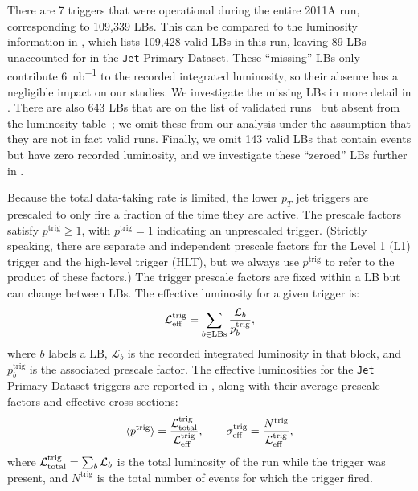 \documentclass[aps,prd,twocolumn,preprintnumbers,nofootinbib,longbibliography,floatfix,superscriptaddress]{revtex4-1}
\begin{document}
There are 7 triggers that were operational during the entire 2011A run, corresponding to 109,339 LBs.
%
This can be compared to the luminosity information in , which lists 109,428 valid LBs in this run, leaving 89 LBs unaccounted for in the \texttt{Jet} Primary Dataset.
%
These ``missing'' LBs only contribute \SI{6}{{nb}^{-1}} to the recorded integrated luminosity, so their absence has a negligible impact on our studies.
%
We investigate the missing LBs in more detail in .
%
There are also 643 LBs that are on the list of validated runs~\cite{CMS:ValidatedRuns2011A} but absent from the luminosity table~\cite{CMS:luminosity2011}; we omit these from our analysis under the assumption that they are not in fact valid runs.
%
Finally, we omit 143 valid LBs that contain events but have zero recorded luminosity, and we investigate these ``zeroed'' LBs further in .


Because the total data-taking rate is limited, the lower $p_T$ jet triggers are prescaled to only fire a fraction of the time they are active.
%
The prescale factors satisfy $p^\text{trig} \geq 1$, with $p^\text{trig} = 1$ indicating an unprescaled trigger.
%
(Strictly speaking, there are separate and independent prescale factors for the Level 1 (L1) trigger and the high-level trigger (HLT), but we always use $p^\text{trig}$ to refer to the product of these factors.)
%
The trigger prescale factors are fixed within a LB but can change between LBs.
%
The effective luminosity for a given trigger is:
\begin{equation}
\label{eq:efflumidef}
\mathcal{L}_{\rm eff}^\text{trig} = \sum_{b \in \text{LBs}} \frac{\mathcal{L}_b}{p_b^\text{trig}},
\end{equation}
where $b$ labels a LB, $\mathcal{L}_b$ is the recorded integrated luminosity in that block, and $p_b^\text{trig}$ is the associated prescale factor.
%
The effective luminosities for the \texttt{Jet} Primary Dataset triggers are reported in , along with their average prescale factors and effective cross sections:
\begin{equation}
\label{eq:averageprescale_sigmaeff}
\langle p^\text{trig} \rangle = \frac{\mathcal{L}^\text{trig}_{\rm total}}{\mathcal{L}_{\rm eff}^\text{trig}}, \qquad \sigma^\text{trig}_{\rm eff} = \frac{N^\text{trig}}{\mathcal{L}_{\rm eff}^\text{trig}},
\end{equation}
where $\mathcal{L}^\text{trig}_{\rm total} = \sum_b \mathcal{L}_b$ is the total luminosity of the run while the trigger was present, and $N^\text{trig}$ is the total number of events for which the trigger fired.
\end{document}
